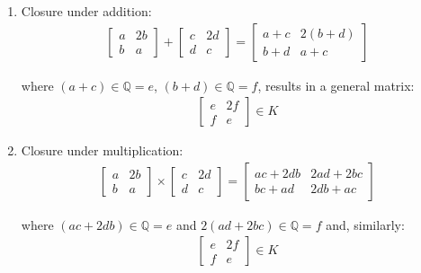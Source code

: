 \documentclass[11pt]{article}
\begin{document}
\begin{enumerate}
\item Closure under addition:
\begin{align*}
  \begin{bmatrix}
    a & 2b \\
    b & a
  \end{bmatrix} + 
  \begin{bmatrix}
    c & 2d \\
    d & c
  \end{bmatrix} =
  \begin{bmatrix}
    a + c & 2(b + d) \\
    b + d & a + c
  \end{bmatrix}
\end{align*}

where $(a + c) \in \mathbb{Q} = e$, $(b + d) \in \mathbb{Q} = f$, results in
a general matrix:
\begin{align*}
  \begin{bmatrix}
    e & 2f \\
    f & e
  \end{bmatrix} \in K
\end{align*}

\item Closure under multiplication:
\begin{align*}
  \begin{bmatrix}
    a & 2b \\
    b & a
  \end{bmatrix} \times 
  \begin{bmatrix}
    c & 2d \\
    d & c
  \end{bmatrix} =
  \begin{bmatrix}
    ac + 2db & 2ad + 2bc \\
    bc + ad & 2db + ac
  \end{bmatrix}
\end{align*}

where $(ac + 2db) \in \mathbb{Q} = e$ and $2(ad + 2bc) \in \mathbb{Q} =
       f$ and, similarly:
\begin{align*}
  \begin{bmatrix}
    e & 2f \\
    f & e
  \end{bmatrix} \in K
\end{align*}


\end{enumerate}
\end{document}
